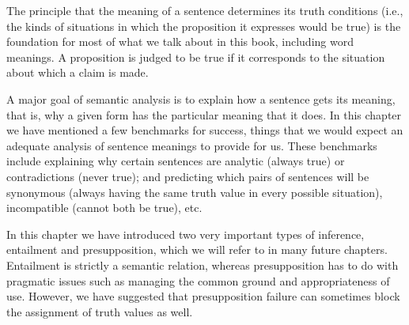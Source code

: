 The principle that the meaning of a sentence determines its truth conditions (i.e., the kinds of situations in which the proposition it expresses would be true) is the foundation for most of what we talk about in this book, including word meanings. A proposition is judged to be true if it corresponds to the situation about which a claim is made.



A major goal of semantic analysis is to explain how a sentence gets its meaning, that is, why a given form has the particular meaning that it does. In this chapter we have mentioned a few benchmarks for success, things that we would expect an adequate analysis of sentence meanings to provide for us. These benchmarks include explaining why certain sentences are analytic (always true) or contradictions (never true); and predicting which pairs of sentences will be synonymous (always having the same truth value in every possible situation), incompatible (cannot both be true), etc.



In this chapter we have introduced two very important types of inference, entailment and presupposition, which we will refer to in many future chapters. Entailment is strictly a semantic relation, whereas presupposition has to do with pragmatic issues such as managing the common ground and appropriateness of use. However, we have suggested that presupposition failure can sometimes block the assignment of truth values as well.




